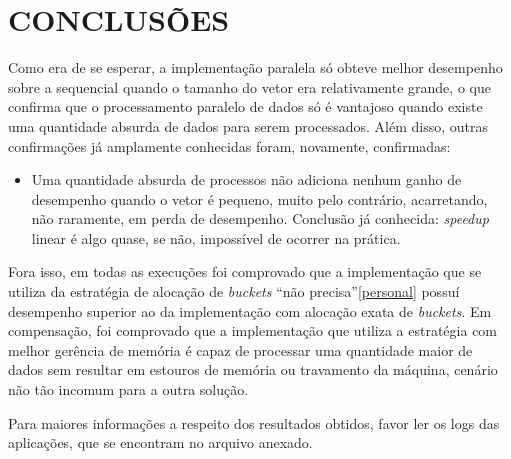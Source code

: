 \section{\normalsize CONCLUSÕES}
	Como era de se esperar, a implementação paralela só obteve melhor desempenho sobre a sequencial quando o tamanho do vetor era relativamente grande, o que confirma que o processamento paralelo de dados só é vantajoso quando existe uma quantidade absurda de dados para serem processados. Além disso, outras confirmações já amplamente conhecidas foram, novamente, confirmadas:
	\begin{itemize}
		\item Uma quantidade absurda de processos não adiciona nenhum ganho de desempenho quando o vetor é pequeno, muito pelo contrário, acarretando, não raramente, em perda de desempenho. Conclusão já conhecida: \textit{speedup} linear é algo quase, se não, impossível de ocorrer na prática.
		
	\end{itemize}
	
	Fora isso, em todas as execuções foi comprovado que a implementação que se utiliza da estratégia de alocação de \textit{buckets} ``não precisa''\ref{personal} possuí desempenho superior ao da implementação com alocação exata de \textit{buckets}. Em compensação, foi comprovado que a implementação que utiliza a estratégia com melhor gerência de memória é capaz de processar uma quantidade maior de dados sem resultar em estouros de memória ou travamento da máquina, cenário não tão incomum para a outra solução.
	
	Para maiores informações a respeito dos resultados obtidos, favor ler os logs das aplicações, que se encontram no arquivo anexado.